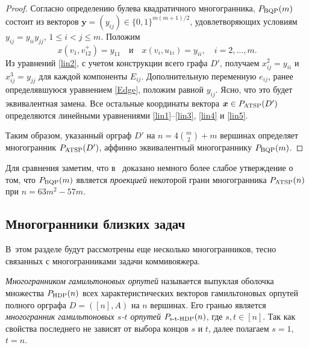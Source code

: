\begin{proof}
	Согласно определению булева квадратичного многогранника, $P_{\textup{BQP}}(m)$ состоит из векторов $\bm{y} = (y_{ij}) \in \{0,1\}^{m(m+1)/2}$, удовлетворяющих условиям $y_{ij} = y_{ii} y_{jj}$, $1 \le i < j \le m$.
	Положим
	$$
	x(v_1, v^+_{12}) = y_{11} \quad \text{и} \quad
	x(v_i, u_{1i})   = y_{ii}, \quad i=2,\dots,m.
	$$
	Из уравнений \eqref{lin2}, с учетом конструкции всего графа $D'$,
	получаем $x^2_{ij} = y_{ii}$ и $x^3_{ij} = y_{jj}$ для каждой компоненты $E_{ij}$.
	Дополнительную переменную $e_{ij}$, ранее определявшуюся уравнением \eqref{Edge}, положим равной $y_{ij}$. 
	Ясно, что это будет эквивалентная замена.
	Все остальные координаты вектора $\bm{x} \in P_{\textup{ATSP}}(D')$ определяются линейными уравнениями \eqref{lin1}--\eqref{lin3}, \eqref{lin4} и \eqref{lin5}.
	
	Таким образом, указанный орграф $D'$ на $n = 4 \binom{m}{2} + m$ вершинах определяет многогранник $P_{\textup{ATSP}}(D')$, аффинно эквивалентный многограннику $P_{\textup{BQP}}(m)$.
\end{proof}

Для сравнения заметим, что в~\cite{FioriniPokutta:2012} доказано немного более слабое утверждение о том, что $P_{\textup{BQP}}(m)$ является \emph{проекцией} некоторой грани многогранника $P_{\textup{ATSP}}(n)$ при $n = 63 m^2 - 57 m$.



%
%


\subsection{Многогранники близких задач}
\label{sec:TSPvarious}

В~этом разделе будут рассмотрены еще несколько многогранников, тесно связанных с многогранниками задачи коммивояжера.

\emph{Многогранником гамильтоновых орпутей} называется выпуклая оболочка множества $P_{\textup{HDP}}(n)$ всех характеристических векторов гамильтоновых орпутей полного орграфа $D=([n],A)$ на $n$ вершинах. 
Его гранью является \emph{многогранник гамильтоновых $s$-$t$ орпутей} $P_{\textup{s-t-HDP}}(n)$, где $s,t \in [n]$. 
Так как свойства последнего не зависят от выбора концов $s$ и $t$, далее полагаем $s=1$, $t=n$.

